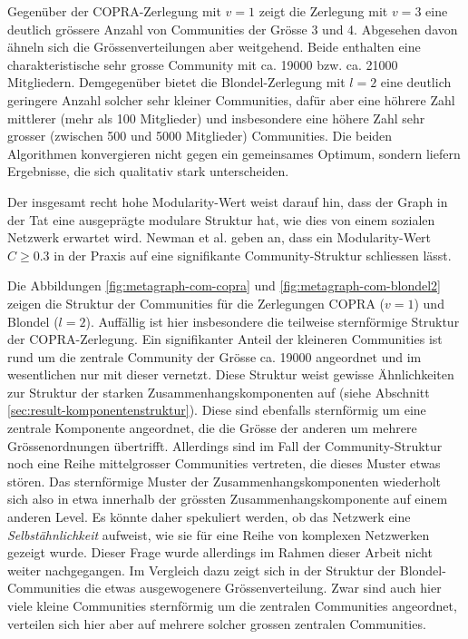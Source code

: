 Gegen\"uber der COPRA-Zerlegung mit $v=1$ zeigt die Zerlegung mit
$v=3$ eine deutlich gr\"ossere Anzahl von Communities der Gr\"osse 3
und 4. Abgesehen davon \"ahneln sich die Gr\"ossenverteilungen aber
weitgehend. Beide enthalten eine charakteristische sehr grosse
Community mit ca. 19000 bzw. ca. 21000 Mitgliedern. Demgegen\"uber
bietet die Blondel-Zerlegung mit $l=2$ eine deutlich geringere Anzahl
solcher sehr kleiner Communities, daf\"ur aber eine h\"ohrere Zahl
mittlerer (mehr als 100 Mitglieder) und insbesondere eine h\"ohere
Zahl sehr grosser (zwischen 500 und 5000 Mitglieder) Communities.  Die
beiden Algorithmen konvergieren nicht gegen ein gemeinsames Optimum,
sondern liefern Ergebnisse, die sich qualitativ stark unterscheiden.

Der insgesamt recht hohe Modularity-Wert weist darauf hin, dass der
Graph in der Tat eine ausgepr\"agte modulare Struktur hat, wie dies
von einem sozialen Netzwerk erwartet wird. Newman et al. geben an,
dass ein Modularity-Wert $C \ge 0.3$ in der Praxis auf eine
signifikante Community-Struktur schliessen l\"asst\cite{Clauset2004}.

Die Abbildungen \ref{fig:metagraph-com-copra} und
\ref{fig:metagraph-com-blondel2} zeigen die Struktur der Communities
f\"ur die Zerlegungen COPRA ($v=1$) und Blondel ($l=2$). Auff\"allig
ist hier insbesondere die teilweise sternf\"ormige Struktur der
COPRA-Zerlegung. Ein signifikanter Anteil der kleineren Communities
ist rund um die zentrale Community der Gr\"osse ca. 19000 angeordnet
und im wesentlichen nur mit dieser vernetzt. Diese Struktur weist
gewisse \"Ahnlichkeiten zur Struktur der starken
Zusammenhangskomponenten auf (siehe Abschnitt
\ref{sec:result-komponentenstruktur}). Diese sind ebenfalls sternf\"ormig um
eine zentrale Komponente angeordnet, die die Gr\"osse der anderen um
mehrere Gr\"ossenordnungen \"ubertrifft. Allerdings sind im Fall der
Community-Struktur noch eine Reihe mittelgrosser Communities
vertreten, die dieses Muster etwas st\"oren. Das sternf\"ormige Muster
der Zusammenhangskomponenten wiederholt sich also in etwa innerhalb
der gr\"ossten Zusammenhangskomponente auf einem anderen Level. Es
k\"onnte daher spekuliert werden, ob das Netzwerk eine
\emph{Selbst\"ahnlichkeit} aufweist, wie sie f\"ur eine Reihe von
komplexen Netzwerken gezeigt wurde\cite{Song2005}. Dieser Frage wurde
allerdings im Rahmen dieser Arbeit nicht weiter nachgegangen. Im
Vergleich dazu zeigt sich in der Struktur der Blondel-Communities die
etwas ausgewogenere Gr\"ossenverteilung. Zwar sind auch hier viele
kleine Communities sternf\"ormig um die zentralen Communities
angeordnet, verteilen sich hier aber auf mehrere solcher grossen
zentralen Communities.

